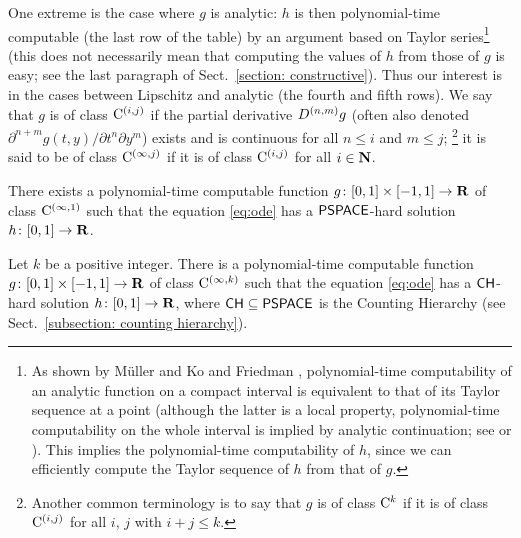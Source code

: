 One extreme is the case where $g$ is analytic: 
$h$ is then polynomial-time computable 
(the last row of the table) 
by an argument based on Taylor series\footnote{
As shown by M\"uller \cite{muller1987uniform} and 
Ko and Friedman \cite{ko1988computing}, 
polynomial-time computability of an analytic function 
on a compact interval is 
equivalent to that of its Taylor sequence at a point 
(although the latter is a local property, 
polynomial-time computability on the whole interval is implied 
by analytic continuation; 
see \cite[Corollary~4.5]{muller1987uniform}
or \cite[Theorem~11]{kawamura2010complexity}). 
This implies the polynomial-time computability of $h$, 
since we can efficiently compute the 
Taylor sequence of $h$ from that of $g$. 
} (this does not necessarily mean that 
computing the values of $h$ from those of $g$ is easy; 
see the last paragraph of Sect.~\ref{section: constructive}). 
Thus our interest is in 
the cases between Lipschitz and analytic 
(the fourth and fifth rows). 
We say that $g$ is of class $\mathrm C ^{(i, j)}$
if the partial derivative $D ^{(n, m)} g$ 
(often also denoted $\partial ^{n + m} g (t, y) / \partial t ^n \partial y ^m$)
exists and is continuous for all $n \le i$ and $m \le j$;%
\footnote{%
Another common terminology is to say that $g$ is of class $\mathrm C ^k$
if it is of class $\mathrm C ^{(i,j)}$ 
for all $i$, $j$ with $i + j \leq k$.}
it is said to be of class $\mathrm C ^{(\infty, j)}$ if
it is of class $\mathrm C ^{(i, j)}$ for all $i \in \mathbf N$. 

\begin{theorem}
 \label{DifferentiableIsPspace}
There exists a polynomial-time computable function
$g \colon [0,1] \times [-1,1] \to \mathbf R$ 
of class $\mathrm C ^{(\infty, 1)}$ such that
the equation \eqref{eq:ode} has a 
$\mathsf{PSPACE}$-hard solution $h \colon [0, 1] \to \mathbf R$. 
 \end{theorem}

 \begin{theorem}
  \label{KTimesIsCH}
Let $k$ be a positive integer. 
There is a polynomial-time computable function
$g \colon [0,1] \times [-1,1] \to \mathbf R$ 
of class $\mathrm C ^{(\infty, k)}$ such that
the equation \eqref{eq:ode} has a 
$\mathsf{CH}$-hard solution $h \colon [0, 1] \to \mathbf R$, 
where $\mathsf{CH} \subseteq \mathsf{PSPACE}$ is the 
Counting Hierarchy (see Sect.~\ref{subsection: counting hierarchy}). 
 \end{theorem}

